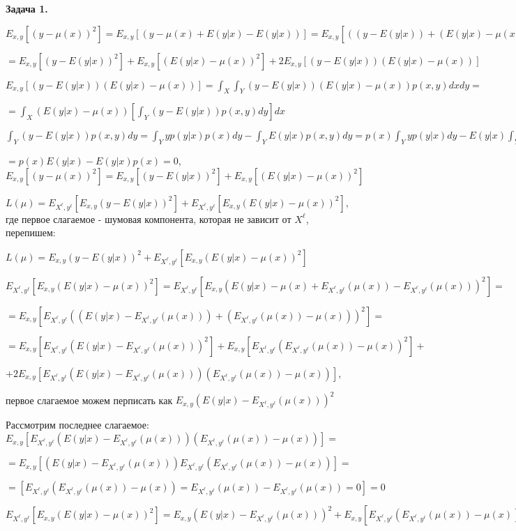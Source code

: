 \documentclass{article}
\begin{document}
    \textbf {Задача 1.}

    $E_{x,y}[(y-\mu(x))^2]=E_{x,y}[(y-\mu(x)+E(y|x)-E(y|x))]=E_{x,y}[((y-E(y|x))+(E(y|x)-\mu(x)))^2]=$

    $=E_{x,y}[(y-E(y|x))^2]+E_{x,y}[(E(y|x)-\mu(x))^2]+2E_{x,y}[(y-E(y|x))(E(y|x)-\mu(x))]$

    $E_{x,y}[(y-E(y|x))(E(y|x)-\mu(x))]=\int_{X}\int_{Y}(y-E(y|x))(E(y|x)-\mu(x))p(x,y)dxdy=$

    $=\int_{X}(E(y|x)-\mu(x))\left[\int_{Y}(y-E(y|x))p(x,y)dy\right]dx$

    $\int_{Y}(y-E(y|x))p(x,y)dy=\int_{Y}yp(y|x)p(x)dy-\int_{Y}E(y|x)p(x,y)dy=p(x)\int_{Y}yp(y|x)dy-E(y|x)\int_{Y}p(x,y)dy=$

    $=p(x)E(y|x)-E(y|x)p(x)=0$, \Rightarrow $E_{x,y}[(y-\mu(x))^2]=E_{x,y}[(y-E(y|x))^2]+E_{x,y}[(E(y|x)-\mu(x))^2]$

    $L(\mu)=E_{X^\ell,y^\ell}[E_{x,y}(y-E(y|x))^2]+E_{X^\ell,y^\ell}[E_{x,y}(E(y|x)-\mu(x))^2]$,
    где первое слагаемое - шумовая компонента, которая не зависит от $X^\ell$, перепишем:

    $L(\mu)=E_{x,y}(y-E(y|x))^2+E_{X^\ell,y^\ell}[E_{x,y}(E(y|x)-\mu(x))^2]$

    $E_{X^\ell,y^\ell}[E_{x,y}(E(y|x)-\mu(x))^2]=E_{X^\ell,y^\ell}[E_{x,y}(E(y|x)-\mu(x)+E_{X^\ell,y^\ell}(\mu(x))-E_{X^\ell,y^\ell}(\mu(x)))^2]=$

    $=E_{x,y}[E_{X^\ell,y^\ell}((E(y|x)-E_{X^\ell,y^\ell}(\mu(x)))+(E_{X^\ell,y^\ell}(\mu(x))-\mu(x)))^2]=$

    $=E_{x,y}[E_{X^\ell,y^\ell}(E(y|x)-E_{X^\ell,y^\ell}(\mu(x)))^2]+E_{x,y}[E_{X^\ell,y^\ell}(E_{X^\ell,y^\ell}(\mu(x))-\mu(x))^2]+$

    $+2E_{x,y}[E_{X^\ell,y^\ell}(E(y|x)-E_{X^\ell,y^\ell}(\mu(x)))(E_{X^\ell,y^\ell}(\mu(x))-\mu(x))]$,

    первое слагаемое можем перписать как $E_{x,y}(E(y|x)-E_{X^\ell,y^\ell}(\mu(x)))^2$

    Рассмотрим последнее слагаемое:
    $E_{x,y}[E_{X^\ell,y^\ell}(E(y|x)-E_{X^\ell,y^\ell}(\mu(x)))(E_{X^\ell,y^\ell}(\mu(x))-\mu(x))]=$

    $=E_{x,y}[(E(y|x)-E_{X^\ell,y^\ell}(\mu(x)))E_{X^\ell,y^\ell}(E_{X^\ell,y^\ell}(\mu(x))-\mu(x))]=$

    $=[E_{X^\ell,y^\ell}(E_{X^\ell,y^\ell}(\mu(x))-\mu(x))=E_{X^\ell,y^\ell}(\mu(x))-E_{X^\ell,y^\ell}(\mu(x))=0]=0$

    \Rightarrow $E_{X^\ell,y^\ell}[E_{x,y}(E(y|x)-\mu(x))^2]=E_{x,y}(E(y|x)-E_{X^\ell,y^\ell}(\mu(x)))^2+E_{x,y}[E_{X^\ell,y^\ell}(E_{X^\ell,y^\ell}(\mu(x))-\mu(x))^2]$
\end{document}
